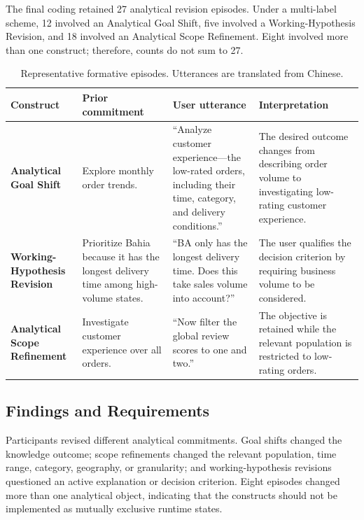 \documentclass[journal]{IEEEtran}
\begin{document}
The final coding retained 27 analytical revision episodes. Under a multi-label scheme, 12 involved an Analytical Goal Shift, five involved a Working-Hypothesis Revision, and 18 involved an Analytical Scope Refinement. Eight involved more than one construct; therefore, counts do not sum to 27.

\begin{table}[t]
\centering
\caption{Representative formative episodes. Utterances are translated from Chinese.}
\label{tab:formative-episodes}
\small
\begin{tabularx}{\textwidth}{p{}p{}Xp{}}
\toprule
\textbf{Construct} & \textbf{Prior commitment} & \textbf{User utterance} & \textbf{Interpretation} \\
\midrule
\textbf{Analytical Goal Shift} & Explore monthly order trends. & ``Analyze customer experience---the low-rated orders, including their time, category, and delivery conditions.'' & The desired outcome changes from describing order volume to investigating low-rating customer experience. \\
\textbf{Working-Hypothesis Revision} & Prioritize Bahia because it has the longest delivery time among high-volume states. & ``BA only has the longest delivery time. Does this take sales volume into account?'' & The user qualifies the decision criterion by requiring business volume to be considered. \\
\textbf{Analytical Scope Refinement} & Investigate customer experience over all orders. & ``Now filter the global review scores to one and two.'' & The objective is retained while the relevant population is restricted to low-rating orders. \\
\bottomrule
\end{tabularx}
\end{table}

\subsection{Findings and Requirements}
\label{sec:formative-findings}

Participants revised different analytical commitments. Goal shifts changed the knowledge outcome; scope refinements changed the relevant population, time range, category, geography, or granularity; and working-hypothesis revisions questioned an active explanation or decision criterion. Eight episodes changed more than one analytical object, indicating that the constructs should not be implemented as mutually exclusive runtime states.
\end{document}
